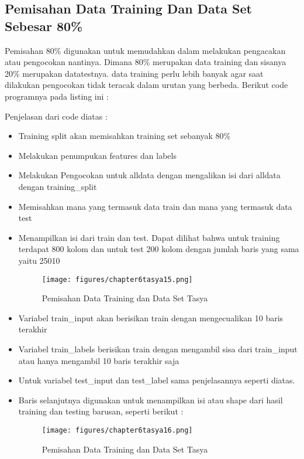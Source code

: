 \subsection{Pemisahan Data Training Dan Data Set Sebesar 80\%}
\par Pemisahan 80\% digunakan untuk memudahkan dalam melakukan pengacakan atau pengocokan nantinya. Dimana 80\% merupakan data training dan sisanya 20\% merupakan datatestnya. data training perlu lebih banyak agar saat dilakukan pengocokan tidak teracak dalam urutan yang berbeda. Berikut code programnya pada listing ini :

Penjelasan dari code diatas :
\begin{itemize}
\item Training split akan memisahkan training set sebanyak 80\%
\item Melakukan penumpukan features dan labels
\item Melakukan Pengocokan untuk alldata dengan mengalikan isi dari alldata dengan training\_split
\item Memisahkan mana yang termasuk data train dan mana yang termasuk data test
\item Menampilkan isi dari train dan test. Dapat dilihat bahwa untuk training terdapat 800 kolom dan untuk test 200 kolom dengan jumlah baris yang sama yaitu 25010
\begin{figure}[ht]
\centering
\texttt{[image: figures/chapter6tasya15.png]}
\caption{Pemisahan Data Training dan Data Set Tasya}
\label{Praktek}
\end{figure}
\item Variabel train\_input akan berisikan train dengan mengecualikan 10 baris terakhir
\item Variabel train\_labels berisikan train dengan mengambil sisa dari train\_input atau hanya mengambil 10 baris terakhir saja
\item Untuk variabel test\_input dan test\_label sama penjelasannya seperti diatas.
\item Baris selanjutnya digunakan untuk menampilkan isi atau shape dari hasil training dan testing barusan, seperti berikut :
\begin{figure}[ht]
\centering
\texttt{[image: figures/chapter6tasya16.png]}
\caption{Pemisahan Data Training dan Data Set Tasya}
\label{Praktek}
\end{figure}
\end{itemize}

